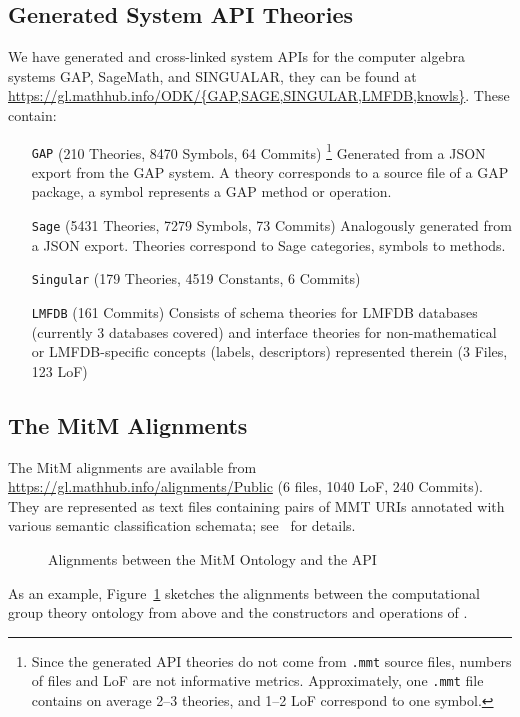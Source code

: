 \subsection{Generated System API Theories}\label{sec:sysapis:gentheories}

We have generated and cross-linked system APIs for the computer algebra systems GAP,
SageMath, and SINGUALAR, they can be found at
\url{https://gl.mathhub.info/ODK/{GAP,SAGE,SINGULAR,LMFDB,knowls}}.
These contain:
\begin{itemize}
	\item[\texttt{GAP}] (210 Theories, 8470 Symbols, 64 Commits)
		\footnote{Since the generated API theories do not come from \texttt{.mmt} source files, 
		numbers of files and LoF are not informative metrics. Approximately, one \texttt{.mmt} 
		file contains on average 2--3 theories, and 1--2 LoF correspond to one symbol.} 
		Generated from a JSON export from the GAP system. A theory corresponds to a
		source file of a GAP package, a symbol represents a GAP method or operation.
	\item[\texttt{Sage}] (5431 Theories, 7279 Symbols, 73 Commits) Analogously generated 
		from a JSON export. Theories correspond to Sage categories, symbols to methods.
	\item[\texttt{Singular}] (179 Theories, 4519 Constants, 6 Commits) 
	\item[\texttt{LMFDB}] (161 Commits) Consists of schema theories for LMFDB databases 
		(currently 3 databases covered) and interface theories for non-mathematical or 
		LMFDB-specific concepts (labels, descriptors) represented therein (3 Files, 123 LoF)
\end{itemize}

\subsection{The MitM Alignments}

The MitM alignments are available from \url{https://gl.mathhub.info/alignments/Public} (6
files, 1040 LoF, 240 Commits). They are represented as text files containing pairs of MMT
URIs annotated with various semantic classification schemata;
see~\cite{MueGauKal:cacfms17} for details.
\begin{figure}[ht]\centering
  \caption{Alignments between the MitM Ontology and the \GAP API}\label{fig:cgtontology}
\end{figure}

As an example, Figure~\ref{fig:cgtontology} sketches the alignments between the
computational group theory ontology from above and the constructors and operations of
\GAP.

